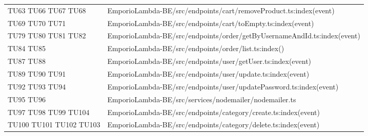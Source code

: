 {\begin{longtable}{C{2cm} C{12.8cm}}
TU63 \newline TU66 \newline TU67 \newline TU68 & EmporioLambda-BE/src/endpoints/cart/removeProduct.ts:index(event)\\

TU69 \newline TU70 \newline TU71 & EmporioLambda-BE/src/endpoints/cart/toEmpty.ts:index(event)\\


TU79 \newline TU80 \newline TU81 \newline TU82 & EmporioLambda-BE/src/endpoints/order/getByUsernameAndId.ts:index(event)\\

TU84 \newline TU85 & EmporioLambda-BE/src/endpoints/order/list.ts:index()\\

TU87 \newline TU88 & EmporioLambda-BE/src/endpoints/user/getUser.ts:index(event)\\

TU89 \newline TU90 \newline TU91 & EmporioLambda-BE/src/endpoints/user/update.ts:index(event)\\

TU92 \newline TU93 \newline TU94 & EmporioLambda-BE/src/endpoints/user/updatePassword.ts:index(event)\\

TU95 \newline TU96 & EmporioLambda-BE/src/services/nodemailer/nodemailer.ts\\

TU97 \newline TU98 \newline TU99 \newline TU104 & EmporioLambda-BE/src/endpoints/category/create.ts:index(event)\\

TU100 \newline TU101 \newline TU102 \newline TU103 & EmporioLambda-BE/src/endpoints/category/delete.ts:index(event)\\


\end{longtable}}
